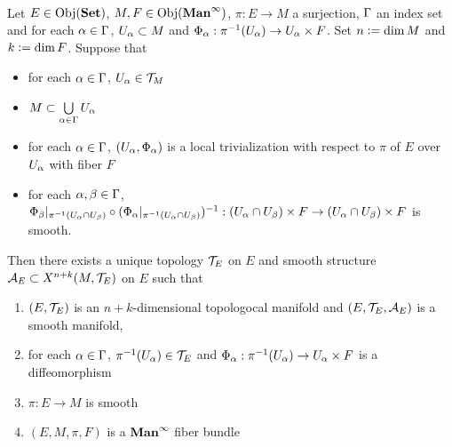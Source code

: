 \documentclass{book}
\begin{document}
	\begin{ex}   \\
		Let $E \in \operatorname{Obj}(\operatorname*{\text{\textbf{Set}}})$, $M, F \in \operatorname{Obj}(\operatorname*{\text{\textbf{Man}}^{\infty}})$, $\pi: E \rightarrow M$ a surjection, $\Gamma$ an index set and for each $\alpha \in \Gamma$, $U_{\alpha} \subset M$ and $\Phi_{\alpha}: \pi^{-1}(U_{\alpha}) \rightarrow U_{\alpha} \times F$. Set $n \vcentcolon= \dim M$ and $k \vcentcolon= \dim F$. Suppose that 
		\begin{itemize}
			\item for each $\alpha \in \Gamma$, $U_{\alpha} \in \mathcal{T}_M$
			\item $M \subset \bigcup\limits_{\alpha \in \Gamma} U_{\alpha}$ 
			\item for each $\alpha \in \Gamma$, $(U_{\alpha}, \Phi_{\alpha})$ is a local trivialization with respect to $\pi$ of $E$ over $U_{\alpha}$ with fiber $F$ 
			\item for each $\alpha,\beta \in \Gamma$, $\Phi_{\beta}|_{\pi^{-1}(U_{\alpha} \cap U_{\beta})} \circ (\Phi_{\alpha}|_{\pi^{-1}(U_{\alpha} \cap U_{\beta})})^{-1}: (U_{\alpha} \cap U_{\beta}) \times F \rightarrow  (U_{\alpha} \cap U_{\beta}) \times F$ is smooth.
		\end{itemize}
		Then there exists a unique topology $\mathcal{T}_E$ on $E$ and smooth structure $\mathcal{A}_E \subset X^{n+k}(M, \mathcal{T}_E)$ on $E$ such that
		\begin{enumerate}
			\item $(E, \mathcal{T}_E)$ is an $n+k$-dimensional topologocal manifold and $(E, \mathcal{T}_E, \mathcal{A}_E)$ is a smooth manifold,
			\item for each $\alpha \in \Gamma$, $ \pi^{-1}(U_{\alpha}) \in \mathcal{T}_E$ and $\Phi_{\alpha}: \pi^{-1}(U_{\alpha}) \rightarrow U_{\alpha} \times F$ is a diffeomorphism
			\item $\pi: E \rightarrow M$ is smooth
			\item $(E, M, \pi, F)$ is a $\operatorname*{\text{\textbf{Man}}^{\infty}}$ fiber bundle
		\end{enumerate}
	\end{ex}
\end{document}
